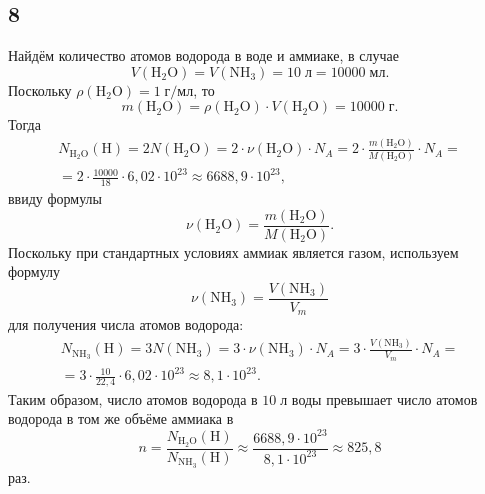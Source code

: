 \subsection{8}

Найдём количество атомов водорода в воде и аммиаке, в случае
\[
V(\mathrm{H_2O})=V(\mathrm{NH_3})=10\;\text{л}=10000\;\text{мл}.
\]
Поскольку $\rho(\mathrm{H_2O})=1\;\text{г/мл}$, то
\[
m(\mathrm{H_2O})=\rho(\mathrm{H_2O})\cdot V(\mathrm{H_2O})=10000\;\text{г}.
\]
Тогда
\begin{multline*}
N_\mathrm{H_2O}(\mathrm{H})=2N(\mathrm{H_2O})=2\cdot\nu(\mathrm{H_2O})\cdot N_A=2\cdot\frac{m(\mathrm{H_2O})}{M(\mathrm{H_2O})}\cdot N_A= \\
=2\cdot\frac{10000}{18}\cdot6{,}02\cdot10^{23}\approx6688{,}9\cdot10^{23},
\end{multline*}
ввиду формулы
\[
\nu(\mathrm{H_2O})=\frac{m(\mathrm{H_2O})}{M(\mathrm{H_2O})}.
\]
Поскольку при стандартных условиях аммиак является газом, используем формулу
\[
\nu(\mathrm{NH_3})=\frac{V(\mathrm{NH_3})}{V_m}
\]
для получения числа атомов водорода:
\begin{multline*}
N_\mathrm{NH_3}(\mathrm{H})=3N(\mathrm{NH_3})=3\cdot\nu(\mathrm{NH_3})\cdot N_A=3\cdot\frac{V(\mathrm{NH_3})}{V_m}\cdot N_A= \\
=3\cdot\frac{10}{22{,}4}\cdot6{,}02\cdot10^{23}\approx8{,}1\cdot10^{23}.
\end{multline*}
Таким образом, число атомов водорода в $10\;\text{л}$ воды превышает число атомов водорода в том же объёме аммиака в
\[
n=\frac{N_\mathrm{H_2O}(\mathrm{H})}{N_\mathrm{NH_3}(\mathrm{H})}\approx\frac{6688{,}9\cdot10^{23}}{8{,}1\cdot10^{23}}\approx825{,}8
\]
раз.
